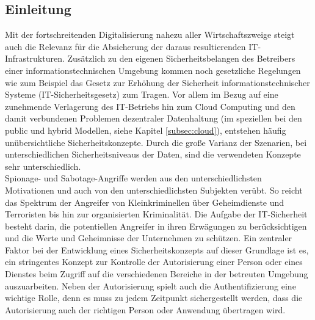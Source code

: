 \documentclass[
book,
a4paper,   
titlepage,  
halfparskip,
12pt        
]{scrartcl}
\begin{document}
\newpage
\begin{onehalfspacing} %
\pagestyle{fancy}
\fancyhf{} %
\fancyhead[L]{\rightmark} %
\fancyhead[R]{\thepage} %


\section{Einleitung}
\label{subsec:einfuehrung}
Mit der fortschreitenden Digitalisierung nahezu aller Wirtschaftszweige steigt auch die Relevanz für die Absicherung der daraus resultierenden \ac{IT}-Infrastrukturen. Zusätzlich zu den eigenen Sicherheitsbelangen des Betreibers einer informationstechnischen Umgebung kommen noch gesetzliche Regelungen wie zum Beispiel das Gesetz zur Erhöhung der Sicherheit informationstechnischer Systeme (IT-Sicherheitsgesetz)\cite{gesetz} zum Tragen. 
Vor allem im Bezug auf eine zunehmende Verlagerung des \ac{IT}-Betriebs hin zum Cloud Computing und den damit verbundenen Problemen dezentraler Datenhaltung (im speziellen bei den public und hybrid Modellen, siehe Kapitel \vref{subsec:cloud}), entstehen häufig unübersichtliche Sicherheitskonzepte. Durch die große Varianz der Szenarien, bei unterschiedlichen Sicherheitsniveaus der Daten, sind die verwendeten Konzepte sehr unterschiedlich.\cite[S. 7f]{risiko}\\
Spionage- und Sabotage-Angriffe werden aus den unterschiedlichsten Motivationen und auch von den unterschiedlichsten Subjekten verübt. So reicht das Spektrum der Angreifer von Kleinkriminellen über Geheimdienste und Terroristen bis hin zur organisierten Kriminalität. Die Aufgabe der \ac{IT}-Sicherheit besteht darin, die potentiellen Angreifer in ihren Erwägungen zu berücksichtigen und die Werte und Geheimnisse der Unternehmen zu schützen. Ein zentraler Faktor bei der Entwicklung eines Sicherheitskonzepts auf dieser Grundlage ist es, ein stringentes Konzept zur Kontrolle der Autorisierung einer Person oder eines Dienstes beim Zugriff auf die verschiedenen Bereiche in der betreuten Umgebung auszuarbeiten. Neben der Autorisierung spielt auch die Authentifizierung eine wichtige Rolle, denn es muss zu jedem Zeitpunkt sichergestellt werden, dass die Autorisierung auch der richtigen Person oder Anwendung übertragen wird.\cite[S. 9]{risiko}\\

\end{onehalfspacing}
\end{document}
